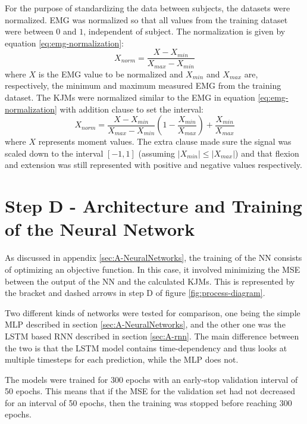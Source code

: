 \documentclass[../main.tex]{subfiles}
\begin{document}
For the purpose of standardizing the data between subjects, the datasets were normalized.
\ac{EMG} was normalized so that all values from the training dataset were between $0$ and $1$, independent of subject.
The normalization is given by equation \ref{eq:emg-normalization}:
\begin{equation}
\label{eq:emg-normalization}
    X_{norm} = \frac{X - X_{min}}{X_{max} - X_{min}}
\end{equation}
where $X$ is the \ac{EMG} value to be normalized and $X_{min}$ and $X_{max}$ are, respectively, the minimum and maximum measured \ac{EMG} from the training dataset. 
The \acp{KJM} were normalized similar to the \ac{EMG} in equation \ref{eq:emg-normalization} with addition clause to set the interval:
\begin{equation}
\label{eq:moment-normalization}
    X_{norm} = \frac{X - X_{min}}{X_{max} - X_{min}}\left(1 - \frac{X_{min}}{X_{max}}\right) + \frac{X_{min}}{X_{max}}
\end{equation}
where $X$ represents moment values. 
The extra clause made sure the signal was scaled down to the interval $[-1,1]$ (assuming $\left|X_{min}\right| \leq \left|X_{max}\right|$) and that flexion and extension was still represented with positive and negative values respectively.

\section{Step D - Architecture and Training of the Neural Network}
As discussed in appendix \ref{sec:A-NeuralNetworks}, the training of the \ac{NN} consists of optimizing an objective function.
In this case, it involved minimizing the \ac{MSE} between the output of the \ac{NN} and the calculated \acp{KJM}.
This is represented by the bracket and dashed arrows in step D of figure \ref{fig:process-diagram}.

Two different kinds of networks were tested for comparison, one being the simple \ac{MLP} described in section \ref{sec:A-NeuralNetworks}, and the other one was the \ac{LSTM} based \ac{RNN} described in section \ref{sec:A-rnn}.
The main difference between the two is that the \ac{LSTM} model contains time-dependency and thus looks at multiple timesteps for each prediction, while the \ac{MLP} does not.

The models were trained for 300 epochs with an early-stop validation interval of 50 epochs.
This means that if the \ac{MSE} for the validation set had not decreased for an interval of 50 epochs, then the training was stopped before reaching 300 epochs.
\end{document}
